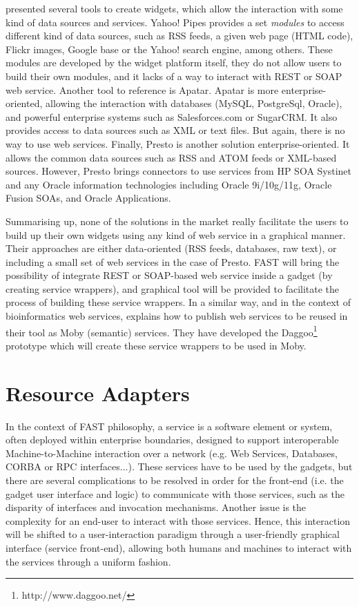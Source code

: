 \documentclass{fast_latex}
\begin{document}
\cite{urmetzer2010fast_state_of_the_art} presented several tools to create widgets, which allow the interaction with some kind of data sources and services. Yahoo! Pipes provides a set \emph{modules} to access different kind of data sources, such as RSS feeds, a given web page (HTML code), Flickr images, Google base or the Yahoo! search engine, among others. These modules are developed by the widget platform itself, they do not allow users to build their own modules, and it lacks of a way to interact with REST or SOAP web service. Another tool to reference is Apatar. Apatar is more enterprise-oriented, allowing the interaction with databases (MySQL, PostgreSql, Oracle), and powerful enterprise systems such as Salesforces.com or SugarCRM. It also provides access to data sources such as XML or text files. But again, there is no way to use web services. Finally, Presto is another solution enterprise-oriented. It allows the common data sources such as RSS and ATOM feeds or XML-based sources. However, Presto brings connectors to use services from HP SOA Systinet and any Oracle information technologies including Oracle 9i/10g/11g, Oracle Fusion SOAs, and Oracle Applications.

Summarising up, none of the solutions in the market really facilitate the users to build up their own widgets using any kind of web service in a graphical manner. Their approaches are either data-oriented (RSS feeds, databases, raw text), or including a small set of web services in the case of Presto. FAST will bring the possibility of integrate REST or SOAP-based web service inside a gadget (by creating service wrappers), and graphical tool will be provided to facilitate the process of building these service wrappers. In a similar way, and in the context of bioinformatics web services, \cite{gordon2008} explains how to publish web services to be reused in their tool as Moby (semantic) services. They have developed the Daggoo\footnote{http://www.daggoo.net/} prototype which will create these service wrappers to be used in Moby.



\clearpage
\section{Resource Adapters} %
\label{sec:resource_adapters}

In the context of FAST philosophy, a service is a software element or system, often deployed within enterprise boundaries, designed to support interoperable Machine-to-Machine interaction over a network (e.g. Web Services, Databases, CORBA or RPC interfaces...). These services have to be used by the gadgets, but there are several complications to be resolved in order for the front-end (i.e. the gadget user interface and logic) to communicate with those services, such as the disparity of interfaces and invocation mechanisms. Another issue is the complexity for an end-user to interact with those services. Hence, this interaction will be shifted to a user-interaction paradigm through a user-friendly graphical interface (service front-end), allowing both humans and machines to interact with the services through a uniform fashion.
\end{document}
